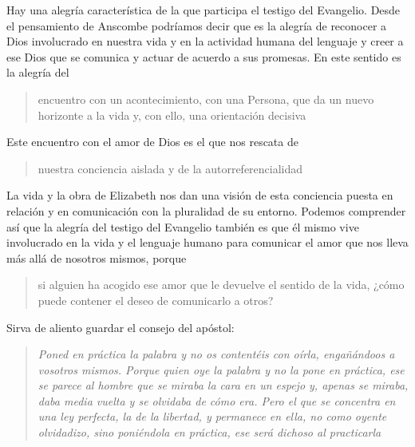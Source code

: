 Hay una alegría característica de la que participa el testigo del Evangelio. Desde el pensamiento de Anscombe podríamos decir que es la alegría de reconocer a Dios involucrado en nuestra vida y en la actividad humana del lenguaje y creer a ese Dios que se comunica y actuar de acuerdo a sus promesas. En este sentido es la alegría del \blockquote[][\,(DCE 1 ;EG 7)]{encuentro con un acontecimiento, con una Persona, que da un nuevo horizonte a la vida y, con ello, una orientación decisiva}. Este encuentro con el amor de Dios es el que nos rescata de \blockquote[][\,(EG 8)]{nuestra conciencia aislada y de la autorreferencialidad}. La vida y la obra de Elizabeth nos dan una visión de esta conciencia puesta en relación y en comunicación con la pluralidad de su entorno. Podemos comprender así que la alegría del testigo del Evangelio también es que él mismo vive involucrado en la vida y el lenguaje humano para comunicar el amor que nos lleva más allá de nosotros mismos, porque \blockquote[][\,(Ibíd.)]{si alguien ha acogido ese amor que le devuelve el sentido de la vida, ¿cómo puede contener el deseo de comunicarlo a otros?} Sirva de aliento guardar el consejo del apóstol: \blockquote[][\,(St 1, 22-25)]{\emph{Poned en práctica la palabra y no os contentéis con oírla, engañándoos a vosotros mismos. Porque quien oye la palabra y no la pone en práctica, ese se parece al hombre que se miraba la cara en un espejo y, apenas se miraba, daba media vuelta y se olvidaba de cómo era. Pero el que se concentra en una ley perfecta, la de la libertad, y permanece en ella, no como oyente olvidadizo, sino poniéndola en práctica, ese será dichoso al practicarla}}.
